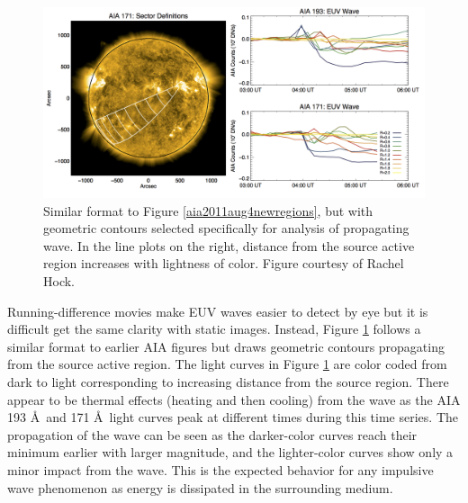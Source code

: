 \begin{figure}[!h]
    \begin{center}
	    \includegraphics[width=166mm]{Images/Aia2011Aug4Wave.png}
    \end{center}
    \caption[AIA wave analysis for 2011 August 4 event]{
        Similar format to Figure \ref{aia2011aug4newregions}, but with geometric contours selected specifically for analysis 
        of propagating wave. In the line plots on the right, distance from the source active region increases with lightness
        of color. Figure courtesy of Rachel Hock. 
	}
    \label{aia2011aug4wave}
\end{figure}

Running-difference movies make EUV waves easier to detect by eye but it is difficult get the same clarity with static images. Instead, Figure \ref{aia2011aug4wave} follows a similar format to earlier AIA figures but draws geometric contours propagating from the source active region. The light curves in Figure \ref{aia2011aug4wave} are color coded from dark to light corresponding to increasing distance from the source region. There appear to be thermal effects (heating and then cooling) from the wave as the AIA 193 \AA\ and 171 \AA\ light curves peak at different times during this time series. The propagation of the wave can be seen as the darker-color curves reach their minimum earlier with larger magnitude, and the lighter-color curves show only a minor impact from the wave. This is the expected behavior for any impulsive wave phenomenon as energy is dissipated in the surrounding medium. 

